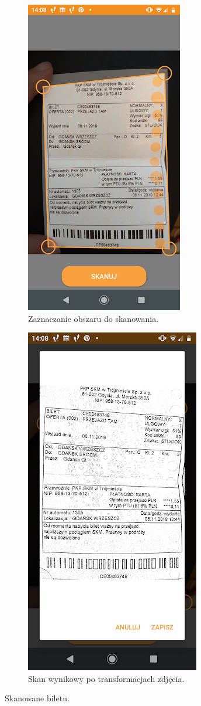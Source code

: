 \documentclass[10pt,twoside,a4paper]{report}
\begin{document}
\begin{figure}[h]
\begin{subfigure}{0.5\textwidth}
\centering
\includegraphics[width=0.9\linewidth, width=5cm]{scan1}
\caption{Zaznaczanie obszaru do skanowania.}
\label{fig:scan1}
\end{subfigure}
\begin{subfigure}{0.5\textwidth}
\centering
\includegraphics[width=0.9\linewidth, width=5cm]{scan2}
\caption{Skan wynikowy po transformacjach zdjęcia.}
\label{fig:scan2}
\end{subfigure}
\caption{Skanowane biletu.}
\label{fig:Eimage}
\end{figure}
\FloatBarrier
\end{document}
